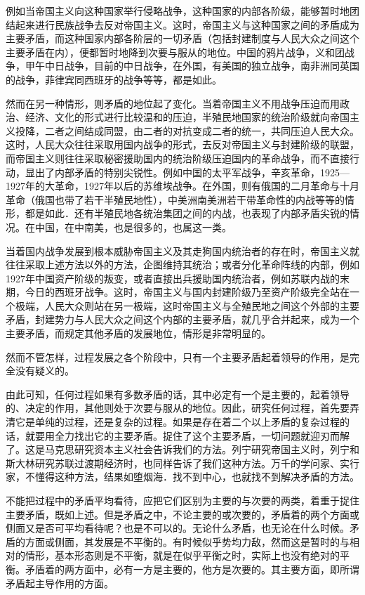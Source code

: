 例如当帝国主义向这种国家举行侵略战争，这种国家的内部各阶级，能够暂时地团结起来进行民族战争去反对帝国主义。这时，帝国主义与这种国家之间的矛盾成为主要矛盾，而这种国家内部各阶层的一切矛盾（包括封建制度与人民大众之间这个主要矛盾在内），便都暂时地降到次要与服从的地位。中国的鸦片战争，义和团战争，甲午中日战争，目前的中日战争，在外国，有美国的独立战争，南非洲同英国的战争，菲律宾同西班牙的战争等等，都是如此。

然而在另一种情形，则矛盾的地位起了变化。当着帝国主义不用战争压迫而用政治、经济、文化的形式进行比较温和的压迫，半殖民地国家的统治阶级就向帝国主义投降，二者之间结成同盟，由二者的对抗变成二者的统一，共同压迫人民大众。这时，人民大众往往采取用国内战争的形式，去反对帝国主义与封建阶级的联盟，而帝国主义则往往采取秘密援助国内的统治阶级压迫国内的革命战争，而不直接行动，显出了内部矛盾的特别尖锐性。例如中国的太平军战争，辛亥革命，1925—1927年的大革命，1927年以后的苏维埃战争。在外国，则有俄国的二月革命与十月革命（俄国也带了若干半殖民地性），中美洲南美洲若干带革命性的内战等等的情形，都是如此．还有半殖民地各统治集团之间的内战，也表现了内部矛盾尖锐的情况。在中国，在中南美，也是很多的，也属这一类。

当着国内战争发展到根本威胁帝国主义及其走狗国内统治者的存在时，帝国主义就往往采取上述方法以外的方法，企图维持其统治；或者分化革命阵线的内部，例如1927年中国资产阶级的叛变，或者直接出兵援助国内统治者，例如苏联内战的末期，今日的西班牙战争。这时，帝国主义与国内封建阶级乃至资产阶级完全站在一个极端，人民大众则站在另一极端，这时帝国主义与全殖民地之间这个外部的主要矛盾，封建势力与人民大众之间这个内部的主要矛盾，就几乎合并起来，成为一个主要矛盾，而规定其他矛盾的发展地位，情形是非常明显的。

然而不管怎样，过程发展之各个阶段中，只有一个主要矛盾起着领导的作用，是完全没有疑义的。

由此可知，任何过程如果有多数矛盾的话，其中必定有一个是主要的，起着领导的、决定的作用，其他则处于次要与服从的地位。因此，研究任何过程，首先要弄清它是单纯的过程，还是复杂的过程。如果是存在着二个以上矛盾的复杂过程的话，就要用全力找出它的主要矛盾。捉住了这个主要矛盾，一切问题就迎刃而解了。这是马克思研究资本主义社会告诉我们的方法。列宁研究帝国主义时，列宁和斯大林研究苏联过渡期经济时，也同样告诉了我们这种方法。万千的学问家、实行家，不懂得这种方法，结果如堕烟海．找不到中心，也就找不到解决矛盾的方法。

不能把过程中的矛盾平均看待，应把它们区别为主要的与次要的两类，着重于捉住主要矛盾，既如上述。但是矛盾之中，不论主要的或次要的，矛盾着的两个方面或侧面又是否可平均看待呢？也是不可以的。无论什么矛盾，也无论在什么时候。矛盾的方面或侧面，其发展是不平衡的。有时候似乎势均力敌，然而这是暂时的与相对的情形，基本形态则是不平衡，就是在似乎平衡之时，实际上也没有绝对的平衡。矛盾着的两方面中，必有一方是主要的，他方是次要的。其主要方面，即所谓矛盾起主导作用的方面。

